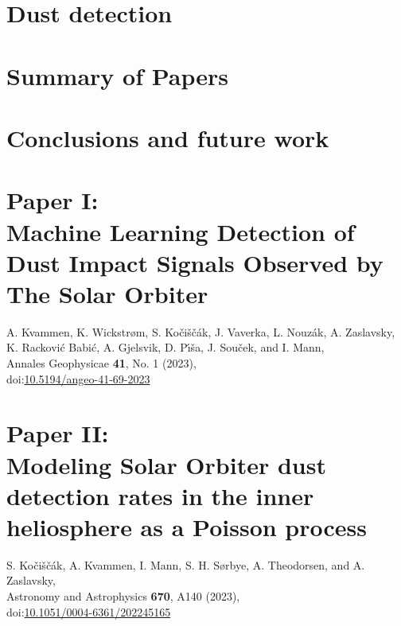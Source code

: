 \documentclass[11pt,twoside,openright]{book}
\begin{document}
\chapter{Dust detection}\label{ch:detection}


\chapter{Summary of Papers}\label{ch:sum-paper}


\chapter{Conclusions and future work}\label{ch:conclusion}





\backmatter

\printbibliography

% 



\chapter{Paper I: \\ Machine Learning Detection of Dust Impact Signals Observed by The Solar Orbiter}
A. Kvammen, K. Wickstr{\o}m, S. Ko{\v{c}}i{\v{s}}{\v{c}}{\'a}k, J. Vaverka, L. Nouz{\'a}k, A. Zaslavsky, K. Rackovi{\'c} Babi{\'c}, A. Gjelsvik, D. P{\'\i}{\v{s}}a, J. Sou{\v{c}}ek, and I. Mann, \\
Annales Geophysicae {\bf 41}, No. 1 (2023),\\
doi:\href{https://doi.org/10.5194/angeo-41-69-2023}{10.5194/angeo-41-69-2023}
\newpage\null\newpage


\chapter{Paper II: \\ Modeling Solar Orbiter dust detection rates in the inner heliosphere as a Poisson process}
S. Ko{\v{c}}i{\v{s}}{\v{c}}{\'a}k, A. Kvammen, I. Mann, S. H. S{\o}rbye, A. Theodorsen, and A. Zaslavsky,\\
Astronomy and Astrophysics {\bf 670}, A140 (2023),\\
doi:\href{https://doi.org/10.1051/0004-6361/202245165}{10.1051/0004-6361/202245165}
\newpage\null\newpage

\end{document}
